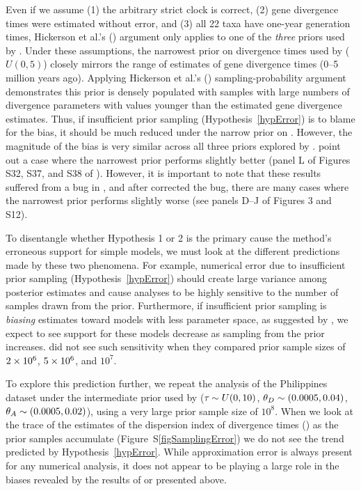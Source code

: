 Even if we assume (1) the arbitrary strict clock is correct, (2) gene
divergence times were estimated without error, and (3) all 22 taxa have
one-year generation times, Hickerson et al.'s
(\citeyear{Hickerson2013}) argument only applies to one of the \emph{three}
priors used by \citet{Oaks2012}.
Under these assumptions, the narrowest prior on divergence times used by
\citet{Oaks2012} ($U(0, 5)$) closely mirrors the range of estimates of
gene divergence times (0--5 million years ago).
Applying Hickerson et al.'s (\citeyear{Hickerson2013}) sampling-probability
argument demonstrates this prior is densely populated with samples with large
numbers of divergence parameters with values younger than the estimated gene
divergence estimates.
Thus, if insufficient prior sampling (Hypothesis~\ref{hypError}) is to blame
for the bias, it should be much reduced under the narrow prior on \divt{}.
However, the magnitude of the bias is very similar across all three priors
explored by \citet{Oaks2012}.
\citet{Hickerson2013} point out a case where the narrowest prior performs
slightly better (panel L of Figures S32, S37, and S38 of \citet{Oaks2012}).
However, it is important to note that these results suffered from a bug in
\msb, and after \citet{Oaks2012} corrected the bug, there are many cases where
the narrowest prior performs slightly worse (see panels D--J of Figures 3 and
S12).

To disentangle whether Hypothesis 1 or 2 is the primary cause the method's
erroneous support for simple models, we must look at the different predictions
made by these two phenomena.
For example, numerical error due to insufficient prior sampling
(Hypothesis~\ref{hypError}) should create large variance among posterior
estimates and cause analyses to be highly sensitive to the number of samples
drawn from the prior.
Furthermore, if insufficient prior sampling is \emph{biasing} estimates toward
models with less parameter space, as suggested by \citet{Hickerson2013}, we
expect to see support for these models decrease as sampling from the prior
increases.
\citet{Oaks2012} did not see such sensitivity when they compared prior sample
sizes of $2\times 10^{6}$, $5\times 10^{6}$, and $10^7$.

To explore this prediction further, we repeat the analysis of the Philippines
dataset under the intermediate prior used by \citet{Oaks2012} ($\tau_{} \sim
U(0, 10)$, $\meanDescendantTheta{} \sim (0.0005, 0.04)$, $\ancestralTheta{}
\sim (0.0005, 0.02)$), using a very large prior sample size of $10^8$.
When we look at the trace of the estimates of the dispersion index of
divergence times (\vmratio{}) as the prior samples accumulate
(Figure~S\ref{figSamplingError}) we do not see the trend predicted by
Hypothesis~\ref{hypError}.
While approximation error is always present for any numerical analysis, it does
not appear to be playing a large role in the biases revealed by the results of
\citet{Oaks2012} or presented above.

